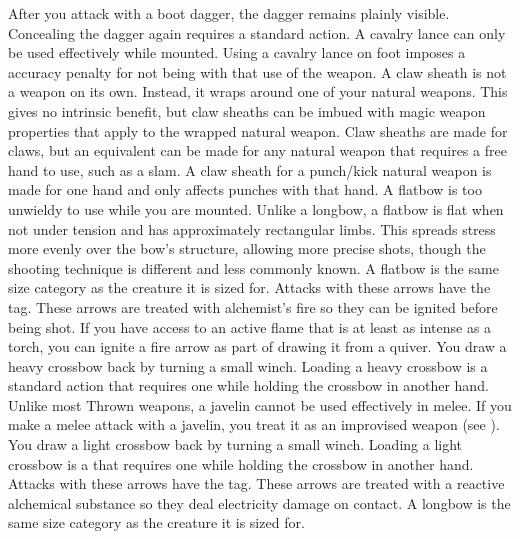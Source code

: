     After you attack with a boot dagger, the dagger remains plainly visible.
    Concealing the dagger again requires a standard action.
     A cavalry lance can only be used effectively while mounted.
    Using a cavalry lance on foot imposes a  accuracy penalty for not being  with that use of the weapon.
     A claw sheath is not a weapon on its own.
    Instead, it wraps around one of your natural weapons.
    This gives no intrinsic benefit, but claw sheaths can be imbued with magic weapon properties that apply to the wrapped natural weapon.
    Claw sheaths are made for claws, but an equivalent can be made for any natural weapon that requires a free hand to use, such as a slam.
    A claw sheath for a punch/kick natural weapon is made for one hand and only affects punches with that hand.
     A flatbow is too unwieldy to use while you are mounted.
    Unlike a longbow, a flatbow is flat when not under tension and has approximately rectangular limbs.
    This spreads stress more evenly over the bow's structure, allowing more precise shots, though the shooting technique is different and less commonly known.
    A flatbow is the same size category as the creature it is sized for.
     Attacks with these arrows have the \atFire tag.
    These arrows are treated with alchemist's fire so they can be ignited before being shot.
    If you have access to an active flame that is at least as intense as a torch, you can ignite a fire arrow as part of drawing it from a quiver.
     You draw a heavy crossbow back by turning a small winch.
    Loading a heavy crossbow is a standard action that requires one  while holding the crossbow in another hand.
     Unlike most Thrown weapons, a javelin cannot be used effectively in melee.
    If you make a melee attack with a javelin, you treat it as an improvised weapon (see ).
     You draw a light crossbow back by turning a small winch.
    Loading a light crossbow is a  that requires one  while holding the crossbow in another hand.
     Attacks with these arrows have the \atElectricity tag.
    These arrows are treated with a reactive alchemical substance so they deal electricity damage on contact.
     A longbow is the same size category as the creature it is sized for.

